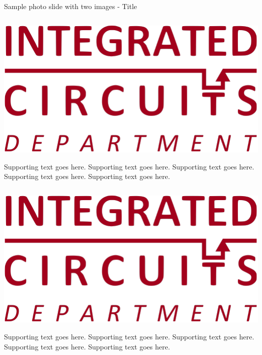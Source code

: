 \documentclass[aspectratio=169, t, 9pt]{beamer} %
\begin{document}
\begin{frame}{Sample photo slide with two images - Title}
\begin{groupcolumns}
    \begin{column}{0.475\textwidth}
        \includegraphics[width=\textwidth]{./template/images/IC.pdf}%


        Supporting text goes here. Supporting text goes here. Supporting text goes here. Supporting text goes here. Supporting text goes here.
    \end{column}
    \vspace{0.05\textwidth}
    \begin{column}{0.475\textwidth}
        \includegraphics[width=\textwidth]{./template/images/IC.pdf}%


        Supporting text goes here. Supporting text goes here. Supporting text goes here. Supporting text goes here. Supporting text goes here.
    \end{column}
\end{groupcolumns}
\end{frame}
\end{document}
